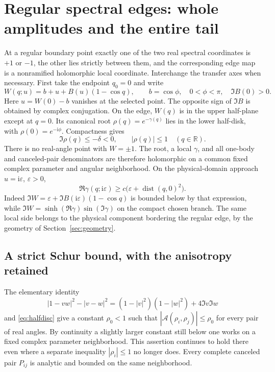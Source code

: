 \documentclass[11pt]{article}
\numberwithin{equation}{section}
\theoremstyle{definition}
\newcommand{\R}{\mathbb R}
\newcommand{\ii}{\mathrm i}
\newcommand{\eps}{\varepsilon}
\newcommand{\dist}{\operatorname{dist}}
\newcommand{\cA}{\mathscr A}
\begin{document}
\section{Regular spectral edges: whole amplitudes and the entire tail}
\label{sec:regular}

At a regular boundary point exactly one of the two real spectral
coordinates is $+1$ or $-1$, the other lies strictly between them, and
the corresponding edge map is a nonramified holomorphic local
coordinate. Interchange the transfer axes when necessary. First take
the endpoint $q_0=0$ and write
\begin{equation}\label{eq:positiveedge}
 W(q;u)=b+u+B(u)(1-\cos q),\qquad
 b=\cos\phi,\quad 0<\phi<\pi,\quad \Im B(0)>0.
\end{equation}
Here $u=W(0)-b$ vanishes at the selected point. The opposite sign of
$\Im B$ is obtained by complex conjugation. On the edge, $W(q)$ is
in the upper half-plane except at $q=0$. Its canonical root
$\rho(q)=e^{-\gamma(q)}$ lies in the lower half-disk, with
$\rho(0)=e^{-\ii\phi}$. Compactness gives
\begin{equation}\label{eq:halfdisc}
 \Im\rho(q)\le-\delta<0,\qquad |\rho(q)|\le1
 \quad(q\in\R).
\end{equation}
There is no real-angle point with $W=\pm1$. The root, a local
$\gamma$, and all one-body and canceled-pair denominators are therefore
holomorphic on a common fixed complex parameter and angular
neighborhood. On the physical-domain approach $u=\ii\eps$, $\eps>0$,
\begin{equation}\label{eq:attenuation}
 \Re\gamma(q;\ii\eps)\ge c\bigl(\eps+\dist(q,0)^2\bigr).
\end{equation}
Indeed $\Im W=\eps+\Im B(\ii\eps)(1-\cos q)$ is bounded below by
that expression, while
$\Im W=\sinh(\Re\gamma)\sin(\Im\gamma)$ on the compact chosen branch.
The same local side belongs to the physical component bordering the
regular edge, by the geometry of Section~\ref{sec:geometry}.

\subsection{A strict Schur bound, with the anisotropy retained}
The elementary identity
\begin{equation}\label{eq:schurdifference}
 |1-vw|^2-|v-w|^2
 =(1-|v|^2)(1-|w|^2)+4\Im v\Im w
\end{equation}
and \eqref{eq:halfdisc} give a constant $\rho_0<1$ such that
$|\cA(\rho_i,\rho_j)|\le\rho_0$ for every pair of real angles.
By continuity a slightly larger constant still below one works on a
fixed complex parameter neighborhood. This assertion continues to hold
there even where a separate inequality $|\rho_i|\le1$ no longer does.
Every complete canceled pair $P_{ij}$ is analytic and bounded on the
same neighborhood.
\end{document}
